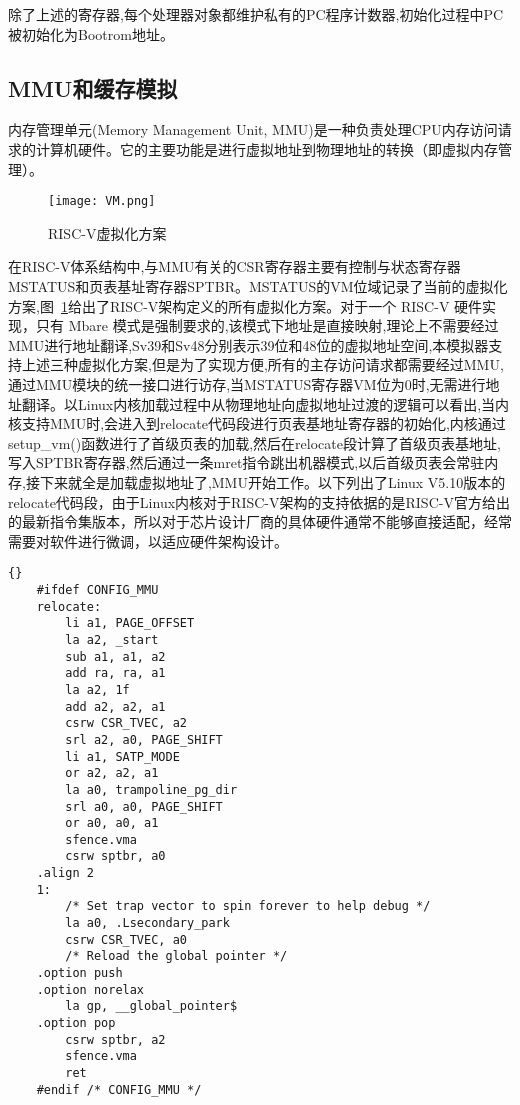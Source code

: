 除了上述的寄存器,每个处理器对象都维护私有的PC程序计数器,初始化过程中PC被初始化为Bootrom地址。

\subsection{MMU和缓存模拟}

内存管理单元(Memory Management Unit, MMU)是一种负责处理CPU内存访问请求的计算机硬件。它的主要功能是进行虚拟地址到物理地址的转换（即虚拟内存管理）。
\begin{figure}[h]
    \centering
    \texttt{[image: VM.png]}
    \caption{RISC-V虚拟化方案}
    \label{fig:VM}
\end{figure}

在RISC-V体系结构中,与MMU有关的CSR寄存器主要有控制与状态寄存器MSTATUS和页表基址寄存器SPTBR。MSTATUS的VM位域记录了当前的虚拟化方案,图~\ref{fig:VM}给出了RISC-V架构定义的所有虚拟化方案。对于一个 RISC-V 硬件实现，只有 Mbare 模式是强制要求的,该模式下地址是直接映射,理论上不需要经过MMU进行地址翻译,Sv39和Sv48分别表示39位和48位的虚拟地址空间,本模拟器支持上述三种虚拟化方案,但是为了实现方便,所有的主存访问请求都需要经过MMU,通过MMU模块的统一接口进行访存,当MSTATUS寄存器VM位为0时,无需进行地址翻译。以Linux内核加载过程中从物理地址向虚拟地址过渡的逻辑可以看出,当内核支持MMU时,会进入到relocate代码段进行页表基地址寄存器的初始化,内核通过setup\_vm()函数进行了首级页表的加载,然后在relocate段计算了首级页表基地址,写入SPTBR寄存器,然后通过一条mret指令跳出机器模式,以后首级页表会常驻内存,接下来就全是加载虚拟地址了,MMU开始工作。以下列出了Linux V5.10版本的relocate代码段，由于Linux内核对于RISC-V架构的支持依据的是RISC-V官方给出的最新指令集版本，所以对于芯片设计厂商的具体硬件通常不能够直接适配，经常需要对软件进行微调，以适应硬件架构设计。
\begin{lstlisting}{}
    #ifdef CONFIG_MMU
    relocate:
        li a1, PAGE_OFFSET
        la a2, _start
        sub a1, a1, a2
        add ra, ra, a1
        la a2, 1f
        add a2, a2, a1
        csrw CSR_TVEC, a2
        srl a2, a0, PAGE_SHIFT
        li a1, SATP_MODE
        or a2, a2, a1
        la a0, trampoline_pg_dir
        srl a0, a0, PAGE_SHIFT
        or a0, a0, a1
        sfence.vma
        csrw sptbr, a0
    .align 2
    1:
        /* Set trap vector to spin forever to help debug */
        la a0, .Lsecondary_park
        csrw CSR_TVEC, a0
        /* Reload the global pointer */
    .option push
    .option norelax
        la gp, __global_pointer$
    .option pop
        csrw sptbr, a2
        sfence.vma
        ret
    #endif /* CONFIG_MMU */    
\end{lstlisting}


